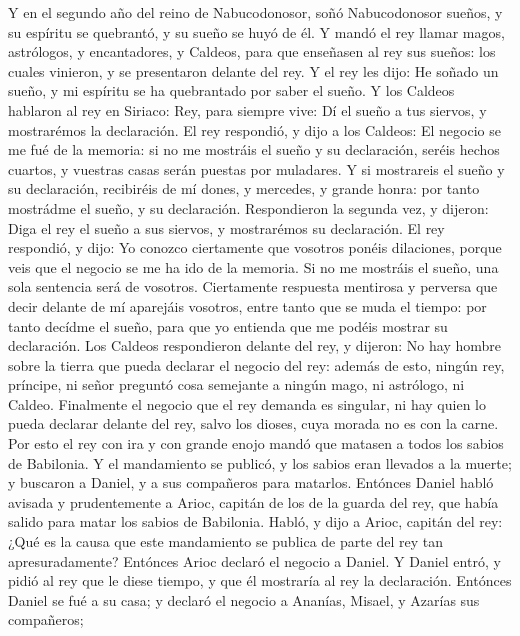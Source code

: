 \bverse Y en el segundo año del reino de Nabucodonosor, soñó Nabucodonosor sueños, y su espíritu se quebrantó, y su sueño se huyó de él.
\bverse Y mandó el rey llamar magos, astrólogos, y encantadores, y Caldeos, para que enseñasen al rey sus sueños: los cuales vinieron, y se presentaron delante del rey.
\bverse Y el rey les dijo: He soñado un sueño, y mi espíritu se ha quebrantado por saber el sueño.
\bverse Y los Caldeos hablaron al rey en Siriaco: Rey, para siempre vive: Dí el sueño a tus siervos, y mostrarémos la declaración.
\bverse El rey respondió, y dijo a los Caldeos: El negocio se me fué de la memoria: si no me mostráis el sueño y su declaración, seréis hechos cuartos, y vuestras casas serán puestas por muladares.
\bverse Y si mostrareis el sueño y su declaración, recibiréis de mí dones, y mercedes, y grande honra: por tanto mostrádme el sueño, y su declaración.
\bverse Respondieron la segunda vez, y dijeron: Diga el rey el sueño a sus siervos, y mostrarémos su declaración.
\bverse El rey respondió, y dijo: Yo conozco ciertamente que vosotros ponéis dilaciones, porque veis que el negocio se me ha ido de la memoria.
\bverse Si no me mostráis el sueño, una sola sentencia será de vosotros. Ciertamente respuesta mentirosa y perversa que decir delante de mí aparejáis vosotros, entre tanto que se muda el tiempo: por tanto decídme el sueño, para que yo entienda que me podéis mostrar su declaración.
\bverse Los Caldeos respondieron delante del rey, y dijeron: No hay hombre sobre la tierra que pueda declarar el negocio del rey: además de esto, ningún rey, príncipe, ni señor preguntó cosa semejante a ningún mago, ni astrólogo, ni Caldeo.
\bverse Finalmente el negocio que el rey demanda es singular, ni hay quien lo pueda declarar delante del rey, salvo los dioses, cuya morada no es con la carne.
\bverse Por esto el rey con ira y con grande enojo mandó que matasen a todos los sabios de Babilonia.
\bverse Y el mandamiento se publicó, y los sabios eran llevados a la muerte; y buscaron a Daniel, y a sus compañeros para matarlos.
\bverse Entónces Daniel habló avisada y prudentemente a Arioc, capitán de los de la guarda del rey, que había salido para matar los sabios de Babilonia.
\bverse Habló, y dijo a Arioc, capitán del rey: ¿Qué es la causa que este mandamiento se publica de parte del rey tan apresuradamente? Entónces Arioc declaró el negocio a Daniel.
\bverse Y Daniel entró, y pidió al rey que le diese tiempo, y que él mostraría al rey la declaración.
\bverse Entónces Daniel se fué a su casa; y declaró el negocio a Ananías, Misael, y Azarías sus compañeros;
